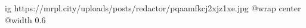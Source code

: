  
 
 
 
 

\ifcmt
  ig https://mrpl.city/uploads/posts/redactor/pqaamfkcj2xjz1xe.jpg
  @wrap center
  @width 0.6
\fi

